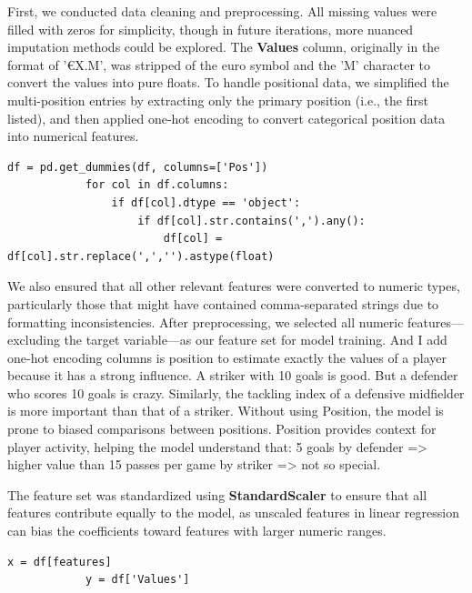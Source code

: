 \documentclass[a4paper,12pt]{article}
\begin{document}
\begin{itemize}[label= {*}, leftmargin= 1cm]
\begin{itemize}[label= {}, leftmargin= 1cm]
        First, we conducted data cleaning and preprocessing. All missing values were filled with zeros for simplicity, though in future iterations, more nuanced imputation methods could be explored. The \textbf{Values} column, originally in the format of '€X.M', was stripped of the euro symbol and the 'M' character to convert the values into pure floats. To handle positional data, we simplified the multi-position entries by extracting only the primary position (i.e., the first listed), and then applied one-hot encoding to convert categorical position data into numerical features.
        \vspace{0.3cm}

        \begin{Verbatim}[xleftmargin= -1.5cm]
            df = pd.get_dummies(df, columns=['Pos'])
            for col in df.columns:
                if df[col].dtype == 'object':
                    if df[col].str.contains(',').any():
                        df[col] = df[col].str.replace(',','').astype(float)
        \end{Verbatim}
        \vspace{0.3cm}

        We also ensured that all other relevant features were converted to numeric types, particularly those that might have contained comma-separated strings due to formatting inconsistencies. After preprocessing, we selected all numeric features—excluding the target variable—as our feature set for model training. And I add one-hot encoding columns is position to estimate exactly the values of a player because it has a strong influence. A striker with 10 goals is good. But a defender who scores 10 goals is crazy. Similarly, the tackling index of a defensive midfielder is more important than that of a striker. Without using Position, the model is prone to biased comparisons between positions. Position provides context for player activity, helping the model understand that: 5 goals by defender => higher value than 15 passes per game by striker => not so special.
        \vspace{0.3cm}

        The feature set was standardized using \textbf{StandardScaler} to ensure that all features contribute equally to the model, as unscaled features in linear regression can bias the coefficients toward features with larger numeric ranges.
        \begin{Verbatim}[xleftmargin= -1cm]
            x = df[features]
            y = df['Values']
        \end{Verbatim}  
        \vspace{0.3cm}
        

\end{itemize}
\end{itemize}
\end{document}
